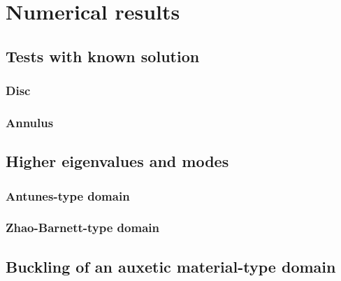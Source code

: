 
\section{Numerical results}

\subsection{Tests with known solution}

\subsubsection{Disc}

\subsubsection{Annulus}

\subsection{Higher eigenvalues and modes}

\subsubsection{Antunes-type domain}

\subsubsection{Zhao-Barnett-type domain}

\subsection{Buckling of an auxetic material-type domain}

